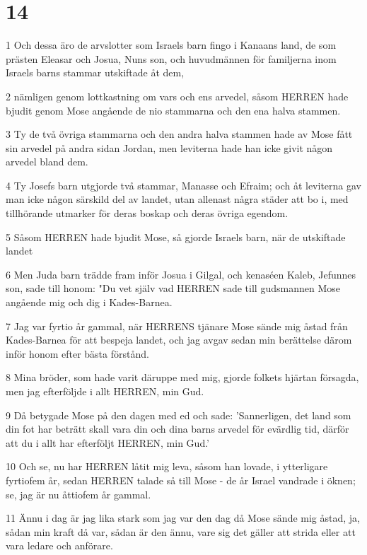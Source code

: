 \chapter{14}

\par 1 Och dessa äro de arvslotter som Israels barn fingo i Kanaans land, de som prästen Eleasar och Josua, Nuns son, och huvudmännen för familjerna inom Israels barns stammar utskiftade åt dem,
\par 2 nämligen genom lottkastning om vars och ens arvedel, såsom HERREN hade bjudit genom Mose angående de nio stammarna och den ena halva stammen.
\par 3 Ty de två övriga stammarna och den andra halva stammen hade av Mose fått sin arvedel på andra sidan Jordan, men leviterna hade han icke givit någon arvedel bland dem.
\par 4 Ty Josefs barn utgjorde två stammar, Manasse och Efraim; och åt leviterna gav man icke någon särskild del av landet, utan allenast några städer att bo i, med tillhörande utmarker för deras boskap och deras övriga egendom.
\par 5 Såsom HERREN hade bjudit Mose, så gjorde Israels barn, när de utskiftade landet
\par 6 Men Juda barn trädde fram inför Josua i Gilgal, och kenaséen Kaleb, Jefunnes son, sade till honom: "Du vet själv vad HERREN sade till gudsmannen Mose angående mig och dig i Kades-Barnea.
\par 7 Jag var fyrtio år gammal, när HERRENS tjänare Mose sände mig åstad från Kades-Barnea för att bespeja landet, och jag avgav sedan min berättelse därom inför honom efter bästa förstånd.
\par 8 Mina bröder, som hade varit däruppe med mig, gjorde folkets hjärtan försagda, men jag efterföljde i allt HERREN, min Gud.
\par 9 Då betygade Mose på den dagen med ed och sade: 'Sannerligen, det land som din fot har beträtt skall vara din och dina barns arvedel för evärdlig tid, därför att du i allt har efterföljt HERREN, min Gud.'
\par 10 Och se, nu har HERREN låtit mig leva, såsom han lovade, i ytterligare fyrtiofem år, sedan HERREN talade så till Mose - de år Israel vandrade i öknen; se, jag är nu åttiofem år gammal.
\par 11 Ännu i dag är jag lika stark som jag var den dag då Mose sände mig åstad, ja, sådan min kraft då var, sådan är den ännu, vare sig det gäller att strida eller att vara ledare och anförare.
